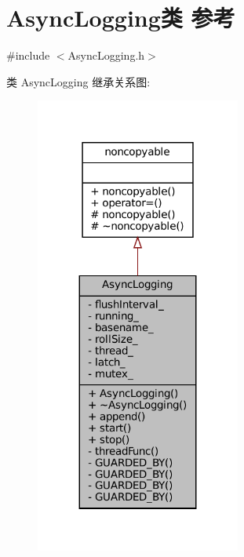 \hypertarget{classmuduo_1_1AsyncLogging}{}\section{Async\+Logging类 参考}
\label{classmuduo_1_1AsyncLogging}


{\ttfamily \#include $<$Async\+Logging.\+h$>$}



类 Async\+Logging 继承关系图\+:
\nopagebreak
\begin{figure}[H]
\begin{center}
\leavevmode
\includegraphics[width=191pt]{classmuduo_1_1AsyncLogging__inherit__graph}
\end{center}
\end{figure}


